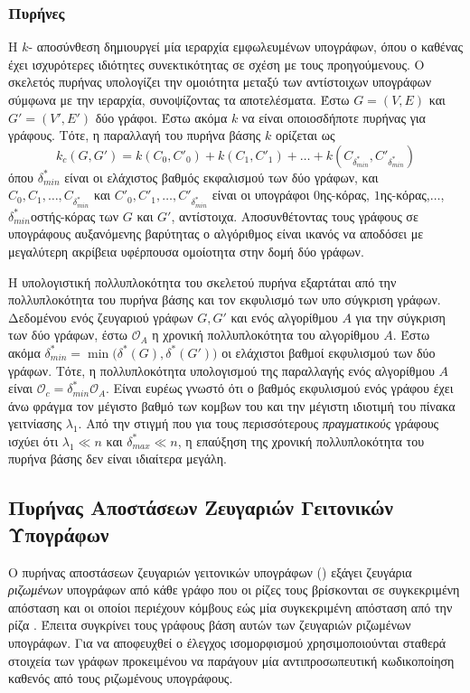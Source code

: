 \subsubsection{ Πυρήνες}
Η $k$- αποσύνθεση δημιουργεί μία ιεραρχία εμφωλευμένων υπογράφων, όπου ο καθένας έχει ισχυρότερες ιδιότητες συνεκτικότητας σε σχέση με τους προηγούμενους.
Ο  σκελετός πυρήνας υπολογίζει την ομοιότητα μεταξύ των αντίστοιχων υπογράφων σύμφωνα με την  ιεραρχία,  συνοψίζοντας τα αποτελέσματα.
Έστω $G=(V,E)$ και $G'=(V',E')$ δύο γράφοι.
Έστω ακόμα $k$ να είναι οποιοσδήποτε πυρήνας για γράφους.
Τότε, η παραλλαγή  του πυρήνα βάσης $k$ ορίζεται ως
\begin{equation*}
  k_c(G, G') = k(C_0,C'_0) + k(C_1,C'_1) + \ldots + k(C_{\delta^*_{min}},C'_{\delta^*_{min}}) 
\end{equation*}
όπου $\delta^*_{min}$ είναι οι ελάχιστος βαθμός εκφαλισμού των δύο γράφων, και $C_0,C_1,\ldots,C_{\delta^*_{min}}$ και $C'_0,C'_1,\ldots,C'_{\delta^*_{min}}$ είναι οι υπογράφοι $0$ης-κόρας, $1$ης-κόρας,$\ldots$, $\delta^*_{min}$οστής-κόρας των $G$ και $G'$, αντίστοιχα.
Αποσυνθέτοντας τους γράφους σε υπογράφους αυξανόμενης βαρύτητας ο αλγόριθμος είναι ικανός να αποδόσει με μεγαλύτερη ακρίβεια υφέρπουσα ομοίοτητα στην δομή δύο γράφων.

Η υπολογιστική πολλυπλοκότητα του σκελετού πυρήνα  εξαρτάται από την πολλυπλοκότητα του πυρήνα βάσης και τον εκφυλισμό των υπο σύγκριση γράφων.
Δεδομένου ενός ζευγαριού γράφων $G, G'$ και ενός αλγορίθμου $A$ για την σύγκριση των δύο γράφων, έστω $\mathcal{O}_A$ η χρονική πολλυπλοκότητα του αλγορίθμου $A$.
Έστω ακόμα $\delta^*_{min} = \min \big( \delta^*(G),\delta^*(G') \big)$ οι ελάχιστοι βαθμοί εκφυλισμού των δύο γράφων.
Τότε, η πολλυπλοκότητα υπολογισμού της παραλλαγής  ενός αλγορίθμου $A$ είναι $\mathcal{O}_{c}=\delta^*_{min}\mathcal{O}_A$.
Είναι ευρέως γνωστό ότι ο βαθμός εκφυλισμού ενός γράφου έχει άνω φράγμα τον μέγιστο βαθμό των κομβων του και την μέγιστη ιδιοτιμή του πίνακα γειτνίασης $\lambda_1$.
Από την στιγμή που για τους περισσότερους \textit{πραγματικούς} γράφους ισχύει ότι $\lambda_1 \ll n$ και $\delta^*_{max} \ll n$, η επαύξηση της χρονική πολλυπλοκότητα του πυρήνα βάσης δεν είναι ιδιαίτερα μεγάλη.

\subsection{Πυρήνας Αποστάσεων Ζευγαριών Γειτονικών Υπογράφων}
Ο πυρήνας αποστάσεων ζευγαριών γειτονικών υπογράφων () εξάγει ζευγάρια \textit{ριζωμένων} υπογράφων από κάθε γράφο που οι ρίζες τους βρίσκονται σε συγκεκριμένη απόσταση και οι οποίοι περιέχουν κόμβους εώς μία συγκεκριμένη απόσταση από την ρίζα \cite{costa2010fast}.
Έπειτα συγκρίνει τους γράφους βάση αυτών των ζευγαριών ριζωμένων υπογράφων.
Για να αποφευχθεί ο έλεγχος ισομορφισμού χρησιμοποιούνται σταθερά στοιχεία των γράφων προκειμένου να παράγουν μία αντιπροσωπευτική κωδικοποίηση καθενός από τους ριζωμένους υπογράφους.


